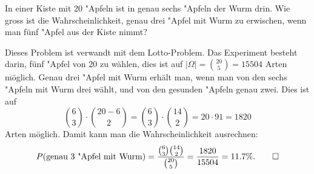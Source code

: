 In einer Kiste mit 20 "Apfeln ist in genau sechs "Apfeln der Wurm drin.
Wie gross ist die Wahrscheinlichkeit, genau drei "Apfel mit Wurm zu
erwischen, wenn man fünf "Apfel aus der Kiste nimmt?


\begin{loesung}
Dieses Problem ist verwandt mit dem Lotto-Problem.
Das Experiment besteht darin, fünf "Apfel von 20 zu wählen, dies ist auf
$|\Omega|=\binom{20}{5}=15504$ Arten möglich.
Genau drei "Apfel mit Wurm erhält man, wenn man von den sechs "Apfeln mit
Wurm drei wählt, und von den gesunden "Apfeln genau zwei. Dies ist auf
\[
\binom{6}{3}\cdot\binom{20-6}{2}
=
\binom{6}{3}\cdot\binom{14}{2}
=
20\cdot 91=1820
\]
Arten möglich. Damit kann man die Wahrscheinlichkeit ausrechnen:
\[
P(\text{genau 3 "Apfel mit Wurm})=\frac{\binom{6}{3}\binom{14}{2}}{\binom{20}{5}}
=\frac{1820}{15504}=11.7\%.
\qedhere
\]
\end{loesung}

